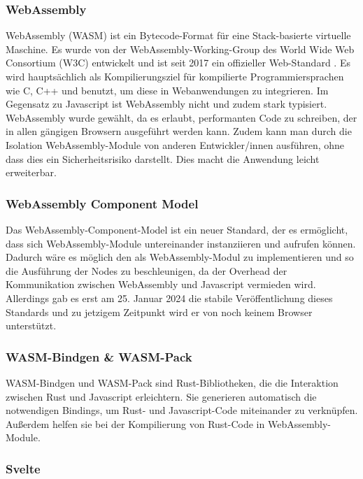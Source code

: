 \documentclass[ngerman]{article}
\begin{document}
\subsubsection{WebAssembly}
WebAssembly (WASM) ist ein Bytecode-Format für eine Stack-basierte virtuelle Maschine. Es wurde von der WebAssembly-Working-Group des World Wide Web Consortium (W3C) entwickelt und ist seit 2017 ein offizieller Web-Standard \cite{Haas2017}. 
\br
Es wird hauptsächlich als Kompilierungsziel für kompilierte Programmiersprachen wie C, C++ und  benutzt, um diese in Webanwendungen zu integrieren. Im Gegensatz zu Javascript ist WebAssembly nicht  und zudem stark typisiert.
\br
WebAssembly wurde gewählt, da es erlaubt, performanten Code zu schreiben, der in allen gängigen Browsern ausgeführt werden kann. 
Zudem kann man durch die Isolation WebAssembly-Module von anderen Entwickler/innen ausführen, ohne dass dies ein Sicherheitsrisiko darstellt. Dies macht die Anwendung leicht erweiterbar.

\subsubsection*{WebAssembly Component Model}
Das WebAssembly-Component-Model ist ein neuer Standard, der es ermöglicht, dass sich WebAssembly-Module untereinander instanziieren und aufrufen können. \cite{bytecodeallianceIntroductionWebAssembly} 
Dadurch wäre es möglich den  als WebAssembly-Modul zu implementieren und so die Ausführung der Nodes zu beschleunigen, da der Overhead der Kommunikation zwischen WebAssembly und Javascript vermieden wird. Allerdings gab es erst am 25. Januar 2024 die stabile Veröffentlichung dieses Standards und zu jetzigem Zeitpunkt wird er von noch keinem Browser unterstützt.

\subsubsection{WASM-Bindgen \& WASM-Pack}
\label{sec:WASM-Bindgen}

WASM-Bindgen und WASM-Pack sind Rust-Bibliotheken, die die Interaktion zwischen Rust und Javascript erleichtern. Sie generieren automatisch die notwendigen Bindings, um Rust- und Javascript-Code miteinander zu verknüpfen. Außerdem helfen sie bei der Kompilierung von Rust-Code in WebAssembly-Module. 
\cite{rustwasmIntroductionwasmbindgen}

\subsubsection{Svelte}
\label{sec:Svelte}
\end{document}
